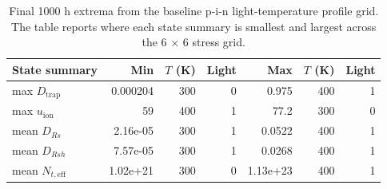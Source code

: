 \begin{table}[H]
\centering
\caption{Final 1000 h extrema from the baseline p-i-n light-temperature profile grid. The table reports where each state summary is smallest and largest across the 6 $\times$ 6 stress grid.}
\label{tab:profile_grid_extrema}
\begin{tabular}{@{}lrrrrrr@{}}
\toprule
State summary & Min & $T$ (K) & Light & Max & $T$ (K) & Light \\
\midrule
max $D_{\mathrm{trap}}$ & 0.000204 & 300 & 0 & 0.975 & 400 & 1 \\
max $u_{\mathrm{ion}}$ & 59 & 400 & 1 & 77.2 & 300 & 0 \\
mean $D_{Rs}$ & 2.16e-05 & 300 & 1 & 0.0522 & 400 & 1 \\
mean $D_{Rsh}$ & 7.57e-05 & 300 & 1 & 0.0268 & 400 & 1 \\
mean $N_{t,\mathrm{eff}}$ & 1.02e+21 & 300 & 0 & 1.13e+23 & 400 & 1 \\
\bottomrule
\end{tabular}
\end{table}
